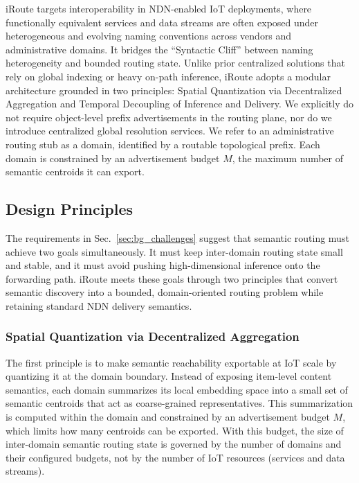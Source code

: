 \documentclass[journal]{IEEEtran}
\newcommand{\sysname}{iRoute}
\begin{document}
\sysname{} targets interoperability in NDN-enabled IoT deployments, where functionally equivalent services and data streams are often exposed under heterogeneous and evolving naming conventions across vendors and administrative domains. It bridges the ``Syntactic Cliff'' between naming heterogeneity and bounded routing state. Unlike prior centralized solutions that rely on global indexing or heavy on-path inference, \sysname{} adopts a modular architecture grounded in two principles: Spatial Quantization via Decentralized Aggregation and Temporal Decoupling of Inference and Delivery. We explicitly do not require object-level prefix advertisements in the routing plane, nor do we introduce centralized global resolution services. We refer to an administrative routing stub as a domain, identified by a routable topological prefix. Each domain is constrained by an advertisement budget $M$, the maximum number of semantic centroids it can export.



\subsection{Design Principles}
\label{sec:design_principles}

The requirements in Sec.~\ref{sec:bg_challenges} suggest that semantic routing must achieve two goals simultaneously.
It must keep inter-domain routing state small and stable, and it must avoid pushing high-dimensional inference onto the forwarding path.
\sysname{} meets these goals through two principles that convert semantic discovery into a bounded, domain-oriented routing problem while retaining standard NDN delivery semantics.

\subsubsection{Spatial Quantization via Decentralized Aggregation}
The first principle is to make semantic reachability exportable at IoT scale by quantizing it at the domain boundary. Instead of exposing item-level content semantics, each domain summarizes its local embedding space into a small set of semantic centroids that act as coarse-grained representatives. This summarization is computed within the domain and constrained by an advertisement budget $M$, which limits how many centroids can be exported. With this budget, the size of inter-domain semantic routing state is governed by the number of domains and their configured budgets, not by the number of IoT resources (services and data streams).
\end{document}
